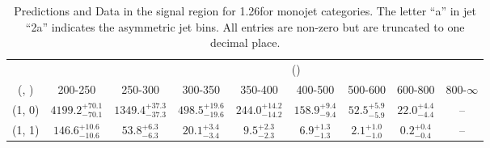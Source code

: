 \begin{table}[h!]
\tiny
\centering
\caption{Predictions and Data in the signal region for 1.26\ifb for monojet categories. The letter ``a'' in jet \eg ``2a''  indicates the asymmetric jet bins. All entries are non-zero but are truncated to one decimal place.\label{tab:yieldsseppost_sig_ewk_mono}}
\begin{tabular}
{ccccccccc}
	\hline\hline
&	& \multicolumn{8}{c}{\scalht (\gev)} \\ 
	 (\njet,  \nb) & 200-250 & 250-300 & 300-350 & 350-400 & 400-500 & 500-600 & 600-800 & 800-$\infty$ \\ [0.8ex] 
\hline
	(1, 0) & $4199.2^{+ 70.1 }_{- 70.1 }$ & $1349.4^{+ 37.3 }_{- 37.3 }$ & $498.5^{+ 19.6 }_{- 19.6 }$ & $244.0^{+ 14.2 }_{- 14.2 }$ & $158.9^{+ 9.4 }_{- 9.4 }$ & $52.5^{+ 5.9 }_{- 5.9 }$ & $22.0^{+ 4.4 }_{- 4.4 }$ & -- \\[0.5ex] 
	(1, 1) & $146.6^{+ 10.6 }_{- 10.6 }$ & $53.8^{+ 6.3 }_{- 6.3 }$ & $20.1^{+ 3.4 }_{- 3.4 }$ & $9.5^{+ 2.3 }_{- 2.3 }$ & $6.9^{+ 1.3 }_{- 1.3 }$ & $2.1^{+ 1.0 }_{- 1.0 }$ & $0.2^{+ 0.4 }_{- 0.4 }$ & -- \\[0.5ex] 
	\hline
	\hline
\end{tabular}
\end{table}
